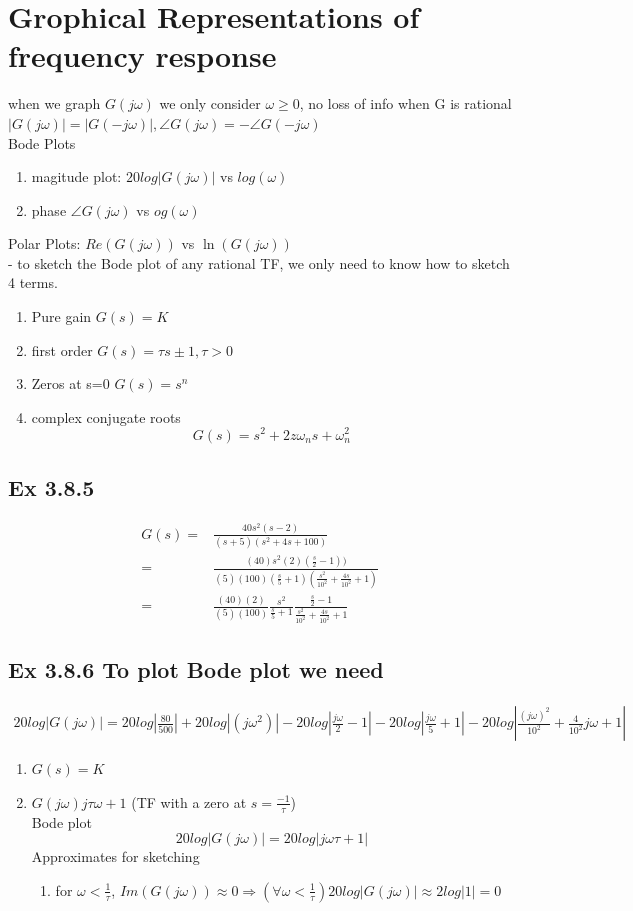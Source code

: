 \documentclass[letterpaper]{article}
\begin{document}
\section{Grophical Representations of frequency response}
when we graph $G(j\omega)$ we only consider $\omega \geq 0$, no loss of info when G is rational $|G(j\omega)|=|G(-j\omega)|, \angle G(j\omega)=-\angle G(-j\omega)$\\
Bode Plots
\begin{enumerate}
	\item magitude plot: $20log|G(j\omega)|$ vs $log(\omega)$
	\item phase $\angle G(j\omega)$ vs $og(\omega)$	
\end{enumerate}
Polar Plots: $Re(G(j\omega))$ vs $\ln(G(j\omega))$\\
- to sketch the Bode plot of any rational TF, we only need to know how to sketch 4 terms.
\begin{enumerate}
	\item Pure gain $G(s)=K$
	\item first order $G(s)=\tau s \pm 1,\tau > 0$
	\item Zeros at s=0 $G(s)=s^n$
	\item complex conjugate roots $$G(s)=s^2+2z\omega_ns+\omega_n^2$$
\end{enumerate}
\subsection*{Ex 3.8.5}
\begin{align*}
	G(s)= & \frac{40s^2(s-2)}{(s+5)(s^2+4s+100)}                                                                      \\
	=     & \frac{(40)s^2(2)(\frac{s}{2}-1))}{(5)(100)(\frac{s}{5}+1)(\frac{s^2}{10^2}+\frac{4s}{10^2}+1)}            \\
	=     & \frac{(40)(2)}{(5)(100)}\frac{s^2}{\frac{s}{5}+1}\frac{\frac{s}{2}-1}{\frac{s^2}{10^2}+\frac{4s}{10^2}+1} 
\end{align*}
\subsection*{Ex 3.8.6 To plot Bode plot we need}
\begin{align*}
	20log|G(j\omega)|=20log|\frac{80}{500}|+20log|(j\omega^2)|-20log|\frac{j\omega}{2}-1|-20log|\frac{j\omega}{5}+1|-20log|\frac{(j\omega)^2}{10^2}+\frac{4}{10^2}j\omega + 1| 
\end{align*}
\begin{enumerate}
	\item $G(s)=K$
	\item $G(j\omega)j\tau\omega+1$ (TF with a zero at $s=\frac{-1}{\tau}$)\\
	      Bode plot $$20log|G(j\omega)|=20log|j\omega \tau +1|$$
	      Approximates for sketching
	      \begin{enumerate}
	      	\item for $\omega < \frac{1}{\tau}$, $Im(G(j\omega)) \approx 0\Rightarrow (\forall \omega < \frac{1}{\tau})20log|G(j\omega)|\approx 2 log|1|=0$
	      \end{enumerate}
\end{enumerate}
\end{document}
